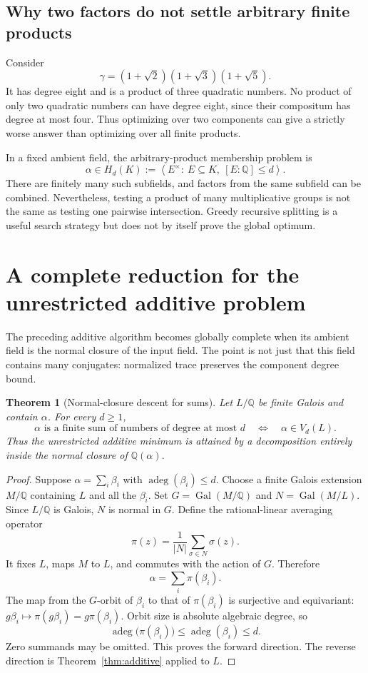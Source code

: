 \documentclass[11pt]{article}
\newcommand{\Q}{\mathbb Q}
\newcommand{\Gal}{\operatorname{Gal}}
\newcommand{\adeg}{\operatorname{adeg}}
\newtheorem{theorem}{Theorem}[section]
\theoremstyle{definition}\newtheorem{definition}[theorem]{Definition}
\theoremstyle{remark}\newtheorem{remark}[theorem]{Remark}
\begin{document}
\subsection{Why two factors do not settle arbitrary finite products}
Consider
\[
 \gamma=(1+\sqrt2)(1+\sqrt3)(1+\sqrt5).
\]
It has degree eight and is a product of three quadratic numbers. No product
of only two quadratic numbers can have degree eight, since their compositum
has degree at most four. Thus optimizing over two components can give a
strictly worse answer than optimizing over all finite products.

In a fixed ambient field, the arbitrary-product membership problem is
\[
 \alpha\in H_d(K):=
 \left\langle E^\times:\ E\subseteq K,\ [E:\Q]\le d\right\rangle.
\]
There are finitely many such subfields, and factors from the same subfield can
be combined. Nevertheless, testing a product of many multiplicative groups
is not the same as testing one pairwise intersection. Greedy recursive splitting
is a useful search strategy but does not by itself prove the global optimum.

\section{A complete reduction for the unrestricted additive problem}
\label{sec:global}
The preceding additive algorithm becomes globally complete when its ambient
field is the normal closure of the input field. The point is not just that
this field contains many conjugates: normalized trace preserves the component
degree bound.

\begin{theorem}[Normal-closure descent for sums]\label{thm:descent}
Let $L/\Q$ be finite Galois and contain $\alpha$. For every $d\ge1$,
\[
 \alpha\text{ is a finite sum of numbers of degree at most }d
 \quad\Longleftrightarrow\quad \alpha\in V_d(L).
\]
Thus the unrestricted additive minimum is attained by a decomposition entirely
inside the normal closure of $\Q(\alpha)$.
\end{theorem}
\begin{proof}
Suppose $\alpha=\sum_i\beta_i$ with $\adeg(\beta_i)\le d$.
Choose a finite Galois extension $M/\Q$ containing $L$ and all the $\beta_i$.
Set $G=\Gal(M/\Q)$ and $N=\Gal(M/L)$. Since $L/\Q$ is Galois, $N$ is normal
in $G$. Define the rational-linear averaging operator
\[
 \pi(z)=\frac1{|N|}\sum_{\sigma\in N}\sigma(z).
\]
It fixes $L$, maps $M$ to $L$, and commutes with the action of $G$.
Therefore
\[
 \alpha=\sum_i\pi(\beta_i).
\]
The map from the $G$-orbit of $\beta_i$ to that of $\pi(\beta_i)$ is
surjective and equivariant: $g\beta_i\mapsto\pi(g\beta_i)=g\pi(\beta_i)$.
Orbit size is absolute algebraic degree, so
\[
 \adeg\bigl(\pi(\beta_i)\bigr)\le\adeg(\beta_i)\le d.
\]
Zero summands may be omitted. This proves the forward direction. The reverse
direction is Theorem~\ref{thm:additive} applied to $L$.
\end{proof}
\end{document}
